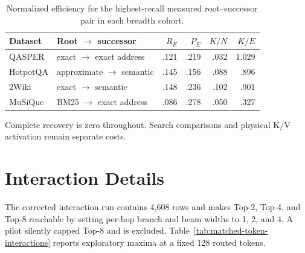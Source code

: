 \documentclass[11pt]{article}
\begin{document}
\begin{table}[H]
\centering
\scriptsize
\caption{Normalized efficiency for the highest-recall measured root--successor pair in each breadth cohort.}
\begin{tabular}{llrrrr}
\toprule
Dataset & Root $\rightarrow$ successor & $R_E$ & $P_E$ & $K/N$ & $K/E$\\
\midrule
QASPER & exact $\rightarrow$ exact address & .121 & .219 & .032 & 1.029\\
HotpotQA & approximate $\rightarrow$ semantic & .145 & .156 & .088 & .896\\
2Wiki & exact $\rightarrow$ semantic & .148 & .236 & .102 & .901\\
MuSiQue & BM25 $\rightarrow$ exact address & .086 & .278 & .050 & .327\\
\bottomrule
\end{tabular}
\end{table}
Complete recovery is zero throughout. Search comparisons and physical K/V activation remain separate costs.

\section{Interaction Details}
\label{app:interactions}
The corrected interaction run contains 4,608 rows and makes Top-2, Top-4, and Top-8 reachable by setting per-hop branch and beam widths to 1, 2, and 4. A pilot silently capped Top-8 and is excluded. Table~\ref{tab:matched-token-interactions} reports exploratory maxima at a fixed 128 routed tokens.
\end{document}
